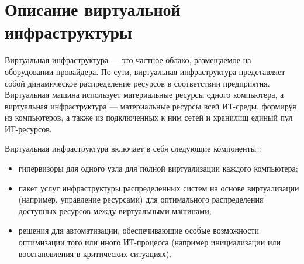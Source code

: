 \section{Описание виртуальной инфраструктуры}

\iffalse 
Пункты:?
\begin{itemize}
  \item Назначение
  \item Системные требования, парк серверов
  \item Технологии, ПО, библиотеки, скрипты
  \item Алгоритмы (несколько, они довольно сложные) функционирования инфраструктуры 
\end{itemize}

Ключевые слова:
виртуализация,
KVM,
OpenVZ,
выделенный сервер,
VPS,
мониторинг,
nagios,
munin,
резервное копирование,
полный/инкрементальный/дифференциальный бэкапы,
репликация MySQL,
репликация DNS,
шардинг,
CDN,
балансировка нагрузки,
типы репликации DNS и MySQL,
DDoS и защита от него,
LVM,
RAID,
панель управления,
ISPmanager/Vesta/Plesk/cpanel/ajenti...,
ISPsystem и его продукция,
обоснование выбора OpenVZ и KVM,
работа с ДЦ,
лицензии на ПО и подсети IP с арендуемым железом,
биллинг (платежная система),
скрипты самопальные,
свои конфиги,
тестирование хостинг-панелей для клиентов,
клиентская и админская документация,
тарифы (услуги),
миграция контейнеров и серверов,
отказоустойчивость,
расширение инфраструктуры

Ссылки: http://blog.selectel.ru/balansirovka-nagruzki-osnovnye-algoritmy-i-metody/

Рисую в гугл драйве схемы.
\fi 

Виртуальная инфраструктура --- это частное облако, размещаемое на оборудовании провайдера.
По сути, виртуальная инфраструктура представляет собой динамическое распределение ресурсов в соответствии предприятия.
Виртуальная машина использует материальные ресурсы одного компьютера, а виртуальная инфраструктура --- материальные ресурсы всей ИТ-среды, формируя из компьютеров, а также из подключенных к ним сетей и хранилищ единый пул ИТ-ресурсов.

Виртуальная инфраструктура включает в себя следующие компоненты \cite{virt-infrast}:
\begin{itemize}
  \item гипервизоры для одного узла для полной виртуализации каждого компьютера;
  \item пакет услуг инфраструктуры распределенных систем на основе виртуализации (например, управление ресурсами) для оптимального распределения доступных ресурсов между виртуальными машинами;
  \item решения для автоматизации, обеспечивающие особые возможности оптимизации того или иного ИТ-процесса (например инициализации или восстановления в критических ситуациях).
\end{itemize}

